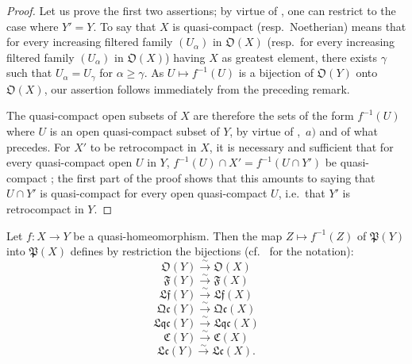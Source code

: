 \begin{proof}
Let us prove the first two assertions; by virtue of , one can restrict to the case where $Y'=Y$.
To say that $X$ is quasi-compact (resp.\ Noetherian) means that for every increasing filtered family $(U_\alpha)$ in $\mathfrak{O}(X)$ (resp.\ for every increasing filtered family $(U_\alpha)$ in $\mathfrak{O}(X)$) having $X$ as greatest element, there exists $\gamma$ such that $U_\alpha=U_\gamma$ for $\alpha\geq\gamma$.
As $U\mapsto f^{-1}(U)$ is a bijection of $\mathfrak{O}(Y)$ onto $\mathfrak{O}(X)$, our assertion follows immediately from the preceding remark.

The quasi-compact open subsets of $X$ are therefore the sets of the form $f^{-1}(U)$ where $U$ is an open quasi-compact subset of $Y$, by virtue of ,~$a)$ and of what precedes.
For $X'$ to be retrocompact in $X$, it is necessary and sufficient that for every quasi-compact open $U$ in $Y$, $f^{-1}(U)\cap X'=f^{-1}(U\cap Y')$ be quasi-compact ; the first part of the proof shows that this amounts to saying that $U\cap Y'$ is quasi-compact for every open quasi-compact $U$, i.e.\ that $Y'$ is retrocompact in $Y$.
\end{proof}

\begin{proposition}[10.2.7]
\label{IV.10.2.7}
Let $f:X\to Y$ be a quasi-homeomorphism.
Then the map $Z\mapsto f^{-1}(Z)$ of $\mathfrak{P}(Y)$ into $\mathfrak{P}(X)$ defines by restriction the bijections (cf.\  for the notation):
\[
  \mathfrak{O}(Y)\xrightarrow{\sim}\mathfrak{O}(X)
\]
\[
  \mathfrak{F}(Y)\xrightarrow{\sim}\mathfrak{F}(X)
\]
\[
  \mathfrak{Lf}(Y)\xrightarrow{\sim}\mathfrak{Lf}(X)
\]
\[
  \mathfrak{Qc}(Y)\xrightarrow{\sim}\mathfrak{Qc}(X)
\]
\[
  \mathfrak{Lqc}(Y)\xrightarrow{\sim}\mathfrak{Lqc}(X)
\]
\[
  \mathfrak{C}(Y)\xrightarrow{\sim}\mathfrak{C}(X)
\]
\[
  \mathfrak{Lc}(Y)\xrightarrow{\sim}\mathfrak{Lc}(X).
\]
\end{proposition}

